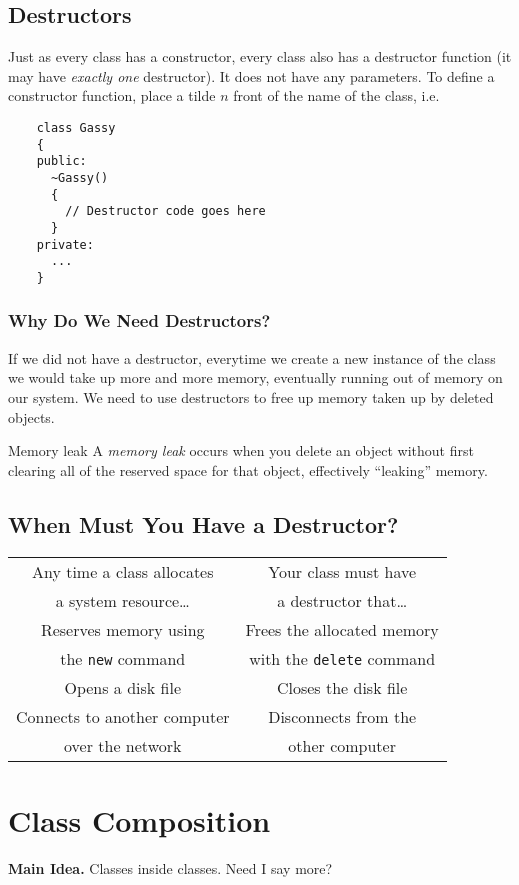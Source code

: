 \documentclass[class=article, crop=false]{standalone}
\begin{document}
  \subsection{Destructors}
  Just as every class has a constructor, every class also has a destructor function (it may have \emph{exactly one} destructor). It does not have any parameters. To define a constructor function, place a tilde $n$ front of the name of the class, i.e.
  \begin{lstlisting}
    class Gassy
    {
    public:
      ~Gassy()
      {
        // Destructor code goes here
      }
    private:
      ...
    }
  \end{lstlisting}
  \subsubsection{Why Do We Need Destructors?}
  If we did not have a destructor, everytime we create a new instance of the class we would take up more and more memory, eventually running out of memory on our system. We need to use destructors to free up memory taken up by deleted objects.
  \begin{definition}{Memory leak}
    A \emph{memory leak} occurs when you delete an object without first clearing all of the reserved space for that object, effectively ``leaking'' memory.
  \end{definition}
  \subsection{When Must You Have a Destructor?}
  \begin{center}
    \begin{tabular}{cc}
      Any time a class allocates & Your class must have \\
      a system resource\ldots & a destructor that\ldots \\[10pt]
      Reserves memory using  & Frees the allocated memory \\
      the \texttt{new} command & with the \texttt{delete} command \\[10pt]
      Opens a disk file & Closes the disk file \\[10pt]
      Connects to another computer  & Disconnects from the \\
      over the network & other computer 
    \end{tabular}
  \end{center}
  \newpage
  \section{Class Composition}
  \textbf{Main Idea.} Classes inside classes. Need I say more?
\end{document}
